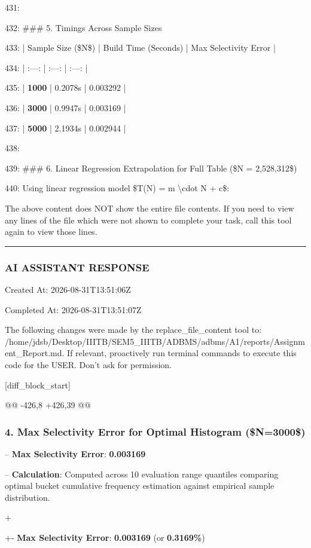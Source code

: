 \documentclass[11pt,a4paper]{article}
\begin{document}
{{{431:

432: \#\#\# 5. Timings Across Sample Sizes

433: | Sample Size (\$N\$) | Build Time (Seconds) | Max Selectivity Error |

434: | :---: | :---: | :---: |

435: | \textbf{1000} | 0.2078s | 0.003292 |

436: | \textbf{3000} | 0.9947s | 0.003169 |

437: | \textbf{5000} | 2.1934s | 0.002944 |

438:

439: \#\#\# 6. Linear Regression Extrapolation for Full Table (\$N = 2,528,312\$)

440: Using linear regression model \$T(N) = m \textbackslash{}cdot N + c\$:

The above content does NOT show the entire file contents. If you need to view any lines of the file which were not shown to complete your task, call this tool again to view those lines.


\hrule

\subsubsection{AI ASSISTANT RESPONSE}

Created At: 2026-08-31T13:51:06Z

Completed At: 2026-08-31T13:51:07Z

The following changes were made by the replace\_file\_content tool to: /home/jdsb/Desktop/IIITB/SEM5\_IIITB/ADBMS/adbms/A1/reports/Assignment\_Report.md. If relevant, proactively run terminal commands to execute this code for the USER. Don't ask for permission.

[diff\_block\_start]

@@ -426,8 +426,39 @@



\subsubsection{4. Max Selectivity Error for Optimal Histogram (\$N=3000\$)}
-- \textbf{Max Selectivity Error}: \textbf{0.003169}

-- \textbf{Calculation}: Computed across 10 evaluation range quantiles comparing optimal bucket cumulative frequency estimation against empirical sample distribution.

+

+- \textbf{Max Selectivity Error}: \textbf{0.003169} (or \textbf{0.3169\%})

}}}
\end{document}
